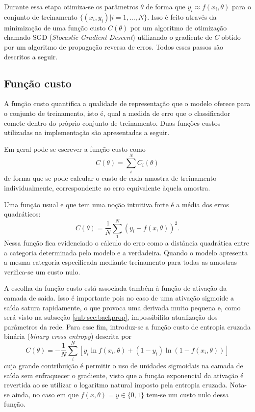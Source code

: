 Durante essa etapa otimiza-se os parâmetros $\theta$ de forma que $y_i \approx f(x_i, \theta)$ para o conjunto de treinamento $\{ (x_i, y_i) | i=1,\dots,N \}$. Isso é feito através da minimização de uma função custo $C(\theta)$ por um algoritmo de otimização chamado SGD (\textit{Stocastic Gradient Descent}) utilizando o gradiente de $C$ obtido por um algoritmo de propagação reversa de erros. Todos esses passos são descritos a seguir.

\subsection{Função custo}
A função custo quantifica a qualidade de representação que o modelo oferece para o conjunto de treinamento, isto é, qual a medida de erro que o classificador comete dentro do próprio conjunto de treinamento. Duas funções custos utilizadas na implementação são apresentadas a seguir.

Em geral pode-se escrever a função custo como
\begin{equation}
C(\theta) = \sum_i^N C_i(\theta)
\end{equation}
de forma que se pode calcular o custo de cada amostra de treinamento individualmente, correspondente ao erro equivalente àquela amostra.

Uma função usual e que tem uma noção intuitiva forte é a média dos erros quadráticos:
\begin{equation}
\label{eq:mse}
C(\theta) = \frac{1}{N} \sum_1^N \left(y_i - f(x,\theta)\right)^2.
\end{equation}
Nessa função fica evidenciado o cálculo do erro como a distância quadrática entre a categoria determinada pelo modelo e a verdadeira. Quando o modelo apresenta a mesma categoria especificada mediante treinamento para todas as amostras verifica-se um custo nulo.

A escolha da função custo está associada também à função de ativação da camada de saída. Isso é importante pois no caso de uma ativação sigmoide a saída satura rapidamente, o que provoca uma derivada muito pequena e, como será visto na subseção \ref{sub-sec:backprop}, impossibilita atualização dos parâmetros da rede. Para esse fim, introduz-se a função custo de entropia cruzada binária (\textit{binary cross entropy}) descrita por
\begin{equation}
\label{eq:bcr}
C(\theta) = -\frac{1}{N} \sum_i^N \left[y_i \ln f(x_i,\theta) + (1-y_i) \ln (1-f(x_i,\theta))\right]
\end{equation}
cuja grande contribuição é permitir o uso de unidades sigmoidais na camada de saída sem enfraquecer o gradiente, visto que a função exponencial da ativação é revertida ao se utilizar o logaritmo natural imposto pela entropia cruzada. Nota-se ainda, no caso em que $f(x,\theta)=y \in \{0, 1\}$ tem-se um custo nulo dessa função.

